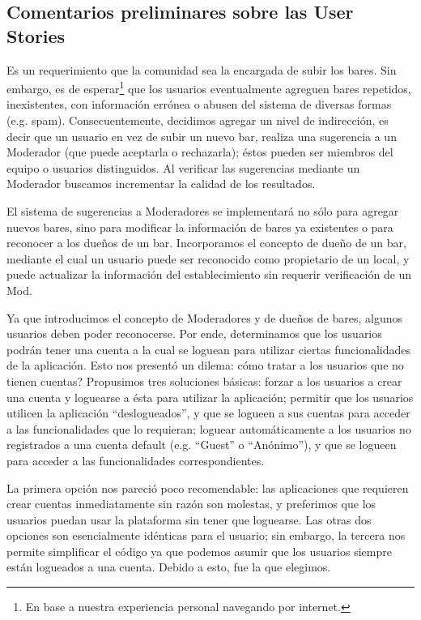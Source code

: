 \subsection{Comentarios preliminares sobre las User Stories}
\par Es un requerimiento que la comunidad sea la encargada de subir los bares. 
Sin embargo, es de esperar\footnote{En base a nuestra experiencia personal navegando por internet.} que los usuarios eventualmente agreguen bares repetidos, inexistentes, con información errónea o abusen del sistema de diversas formas (e.g. spam).
Consecuentemente, decidimos agregar un nivel de indirección, es decir que un usuario en vez de subir un nuevo bar, realiza una sugerencia a un Moderador (que puede aceptarla o rechazarla); éstos pueden ser miembros del equipo o usuarios distinguidos. 
Al verificar las sugerencias mediante un Moderador buscamos incrementar la calidad de los resultados.

\par El sistema de sugerencias a Moderadores se implementará no sólo para agregar nuevos bares, sino para modificar la información de bares ya existentes o para reconocer a los dueños de un bar.
Incorporamos el concepto de dueño de un bar, mediante el cual un usuario puede ser reconocido como propietario de un local, y puede actualizar la información del establecimiento sin requerir verificación de un Mod.

\par Ya que introducimos el concepto de Moderadores y de dueños de bares, algunos usuarios deben poder reconocerse.
Por ende, determinamos que los usuarios podrán tener una cuenta a la cual se loguean para utilizar ciertas funcionalidades de la aplicación.
Esto nos presentó un dilema: cómo tratar a los usuarios que no tienen cuentas?
Propusimos tres soluciones básicas: forzar a los usuarios a crear una cuenta y loguearse a ésta para utilizar la aplicación; permitir que los usuarios utilicen la aplicación ``deslogueados'', y que se logueen a sus cuentas para acceder a las funcionalidades que lo requieran; loguear automáticamente a los usuarios no registrados a una cuenta default (e.g. ``Guest'' o ``Anónimo''), y que se logueen para acceder a las funcionalidades correspondientes.

\par La primera opción nos pareció poco recomendable: las aplicaciones que requieren crear cuentas inmediatamente sin razón son molestas, y preferimos que los usuarios puedan usar la plataforma sin tener que loguearse.
Las otras dos opciones son esencialmente idénticas para el usuario; sin embargo, la tercera nos permite simplificar el código ya que podemos asumir que los usuarios siempre están logueados a una cuenta. 
Debido a esto, fue la que elegimos.

